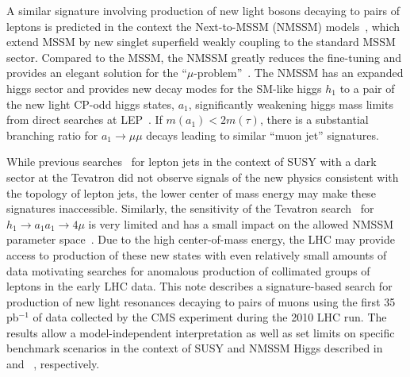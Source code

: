A similar signature involving production of new light bosons decaying to pairs of leptons  is predicted in the context the 
Next-to-MSSM (NMSSM) models~\cite{Nilles:1982dy,Frere:1983ag,Ellis:1988er,Drees:1988fc,Ellwanger:1993xa,Ellwanger:1995ru,Miller:2003ay}, which extend MSSM by new singlet superfield weakly coupling to the standard MSSM sector. Compared to the MSSM, the NMSSM greatly reduces the fine-tuning and provides an elegant solution for the ``$\mu$-problem''~\cite{mu-problem}. The NMSSM has an expanded higgs sector and provides new decay modes for the SM-like higgs $h_1$ to a pair of the new light CP-odd higgs states, $a_1$, significantly weakening higgs mass limits from direct searches at LEP~\cite{lep2exclusion}. If $m(a_1)<2 m(\tau)$, there is a substantial branching ratio for $a_1 \to \mu \mu$ decays leading to similar ``muon jet'' signatures.

While previous searches~\cite{D01,D02} for lepton jets in the context of SUSY with a dark sector at the Tevatron did not observe signals of the new physics consistent with the topology of lepton jets, the lower center of mass energy may make these signatures inaccessible. Similarly, the sensitivity of the Tevatron search~\cite{Abazov:2009yi} for $h_1 \to a_1 a_1 \to 4 \mu$ is very limited and has a small impact on the allowed NMSSM parameter space~\cite{Belyaev:nmssm}. Due to the high center-of-mass energy, the LHC may provide access to production of these new states with even relatively small amounts of data motivating searches for anomalous production of collimated groups of leptons in the early LHC data. This note describes a signature-based search for production of new light resonances decaying to pairs of muons using the first 35 pb$^{-1}$ of data collected by the CMS experiment during the 2010 LHC run. The results allow a model-independent interpretation as well as set limits on specific benchmark scenarios in the context of SUSY and NMSSM Higgs described in~\cite{Ruderman,BaiHan} and ~\cite{Belyaev:nmssm}, respectively.
